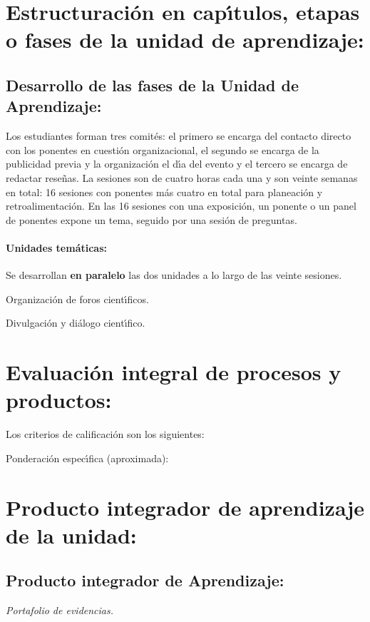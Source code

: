 \section{Estructuraci\'{o}n en cap\'{\i}tulos, etapas o fases de la unidad de
  aprendizaje:}

\subsection{Desarrollo de las fases de la Unidad de Aprendizaje:}

\quad

Los estudiantes forman tres comit\'{e}s: el primero se encarga del
contacto directo con los ponentes en cuesti\'{o}n organizacional, el
segundo se encarga de la publicidad previa y la organizaci\'{o}n el
d\'{\i}a del evento y el tercero se encarga de redactar rese\~{n}as.
La sesiones son de cuatro horas cada una y son veinte semanas en
total: 16 sesiones con ponentes m\'{a}s cuatro en total para
planeaci\'{o}n y retroalimentaci\'{o}n. En las 16 sesiones con una
exposici\'{o}n, un ponente o un panel de ponentes expone un tema,
seguido por una sesi\'{o}n de preguntas.

\paragraph{Unidades tem\'{a}ticas:}

\quad

Se desarrollan {\bf en paralelo} las dos unidades a lo largo de las
veinte sesiones.

\begin{description}[itemsep=-2pt]
\item[U1]{Organizaci\'{o}n de foros cient\'{\i}ficos.}
\item[U2]{Divulgaci\'{o}n y di\'{a}logo cient\'{\i}fico.}
\end{description}



\newpage





\newpage

\section{Evaluaci\'{o}n integral de procesos y productos:}

Los criterios de calificaci\'{o}n son los siguientes:

  
Ponderaci\'{o}n espec\'{\i}fica (aproximada):



\section{Producto integrador de aprendizaje de la unidad:}

\subsection{Producto integrador de Aprendizaje:}

\quad

{\em Portafolio de evidencias.}



